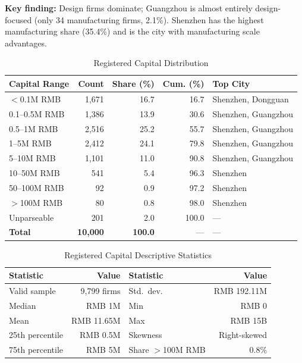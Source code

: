 \documentclass[12pt,a4paper]{article}
\newcommand{\tableHeaderRow}{\rowcolor{tealPrimary}\color{white}}
\newcommand{\tableOddRow}{\rowcolor{mintBG}}
\newcommand{\tableEvenRow}{\rowcolor{white}}
\begin{document}
\textbf{Key finding:} Design firms dominate; Guangzhou is almost entirely design-focused
(only 34 manufacturing firms, 2.1\%). Shenzhen has the highest manufacturing share (35.4\%)
and is the city with manufacturing scale advantages.

\begin{table}[H]
\centering
\caption{Registered Capital Distribution}
\label{tab:capital}
\begin{tabular}{lrrrl}
\toprule
\tableHeaderRow
\textbf{Capital Range} & \textbf{Count} & \textbf{Share (\%)} & \textbf{Cum. (\%)} & \textbf{Top City} \\
\midrule
\tableOddRow  $<$0.1M RMB       & 1,671 & 16.7 & 16.7 & Shenzhen, Dongguan \\
\tableEvenRow 0.1--0.5M RMB     & 1,386 & 13.9 & 30.6 & Shenzhen, Guangzhou \\
\tableOddRow  0.5--1M RMB       & 2,516 & 25.2 & 55.7 & Shenzhen, Guangzhou \\
\tableEvenRow 1--5M RMB         & 2,412 & 24.1 & 79.8 & Shenzhen, Guangzhou \\
\tableOddRow  5--10M RMB        & 1,101 & 11.0 & 90.8 & Shenzhen, Guangzhou \\
\tableEvenRow 10--50M RMB       & 541   & 5.4  & 96.3 & Shenzhen \\
\tableOddRow  50--100M RMB      & 92    & 0.9  & 97.2 & Shenzhen \\
\tableEvenRow $>$100M RMB       & 80    & 0.8  & 98.0 & Shenzhen \\
\tableOddRow  Unparseable       & 201   & 2.0  & 100.0 & --- \\
\midrule
\tableEvenRow \textbf{Total}    & \textbf{10,000} & \textbf{100.0} & --- & --- \\
\bottomrule
\end{tabular}
\end{table}

\begin{table}[H]
\centering
\caption{Registered Capital Descriptive Statistics}
\label{tab:capital_stat}
\begin{tabular}{lrlr}
\toprule
\tableHeaderRow
\textbf{Statistic} & \textbf{Value} & \textbf{Statistic} & \textbf{Value} \\
\midrule
\tableOddRow  Valid sample   & 9,799 firms & Std.\ dev.       & RMB 192.11M \\
\tableEvenRow Median         & RMB 1M      & Min              & RMB 0 \\
\tableOddRow  Mean           & RMB 11.65M  & Max              & RMB 15B \\
\tableEvenRow 25th percentile & RMB 0.5M   & Skewness         & Right-skewed \\
\tableOddRow  75th percentile & RMB 5M     & Share $>$100M RMB & 0.8\% \\
\bottomrule
\end{tabular}
\end{table}
\end{document}
